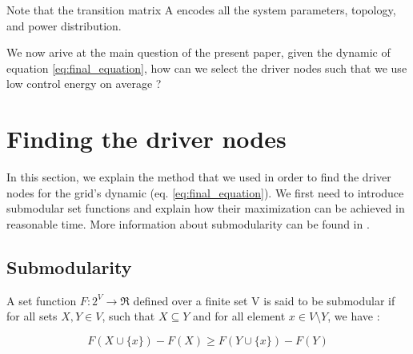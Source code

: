 \documentclass[conference]{IEEEtran}
\begin{document}
Note that the transition matrix A encodes all the system parameters, topology, and power distribution.

We now arive at the main question of the present paper, given the dynamic of equation \ref{eq:final_equation}, how can we select the driver nodes such that we use low control energy on average ?



\section{Finding the driver nodes}
\label{sec:control_and_submodularity}

In this section, we explain the method that we used in order to find the driver nodes for the grid's dynamic (eq. \ref{eq:final_equation}). We first need to introduce submodular set functions and explain how their maximization can be achieved in reasonable time. More information about submodularity can be found in \cite{Krause2014}.

\subsection{Submodularity}

A set function $ F:2^{V} \longrightarrow \Re $ defined over a finite set V is said to be submodular if for all sets $ X, Y \in V$, such that $ X \subseteq Y$ and for all element $ x \in V \setminus Y$, we have :

\begin{equation}
F(X \cup \{ x \} ) - F(X) \geq F(Y \cup \{ x \} ) - F(Y)
\end{equation} 
\end{document}
